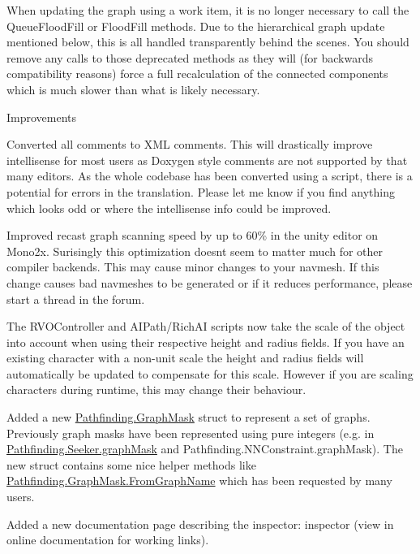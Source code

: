 \begin{DoxyItemize}
\begin{DoxyItemize}
\begin{DoxyItemize}
\item When updating the graph using a work item, it is no longer necessary to call the Queue\+Flood\+Fill or Flood\+Fill methods. Due to the hierarchical graph update mentioned below, this is all handled transparently behind the scenes. You should remove any calls to those deprecated methods as they will (for backwards compatibility reasons) force a full recalculation of the connected components which is much slower than what is likely necessary.
\end{DoxyItemize}
\item Improvements
\begin{DoxyItemize}
\item Converted all comments to X\+ML comments. This will drastically improve intellisense for most users as Doxygen style comments are not supported by that many editors. As the whole codebase has been converted using a script, there is a potential for errors in the translation. Please let me know if you find anything which looks odd or where the intellisense info could be improved.
\item Improved recast graph scanning speed by up to 60\% in the unity editor on Mono2x. Surisingly this optimization doesn\textquotesingle{}t seem to matter much for other compiler backends. This may cause minor changes to your navmesh. If this change causes bad navmeshes to be generated or if it reduces performance, please start a thread in the forum.
\item The R\+V\+O\+Controller and A\+I\+Path/\+Rich\+AI scripts now take the scale of the object into account when using their respective height and radius fields. If you have an existing character with a non-\/unit scale the height and radius fields will automatically be updated to compensate for this scale. However if you are scaling characters during runtime, this may change their behaviour.
\item Added a new \mbox{\hyperlink{struct_pathfinding_1_1_graph_mask}{Pathfinding.\+Graph\+Mask}} struct to represent a set of graphs. Previously graph masks have been represented using pure integers (e.\+g. in \mbox{\hyperlink{class_pathfinding_1_1_seeker_a8b7ceda751d8863d047f052a80a4bc26}{Pathfinding.\+Seeker.\+graph\+Mask}} and Pathfinding.\+N\+N\+Constraint.\+graph\+Mask). The new struct contains some nice helper methods like \mbox{\hyperlink{struct_pathfinding_1_1_graph_mask_aa3cbffd72929638b6338ad703980dfff}{Pathfinding.\+Graph\+Mask.\+From\+Graph\+Name}} which has been requested by many users.
\item Added a new documentation page describing the inspector\+: inspector (view in online documentation for working links).

\end{DoxyItemize}
\end{DoxyItemize}
\end{DoxyItemize}
